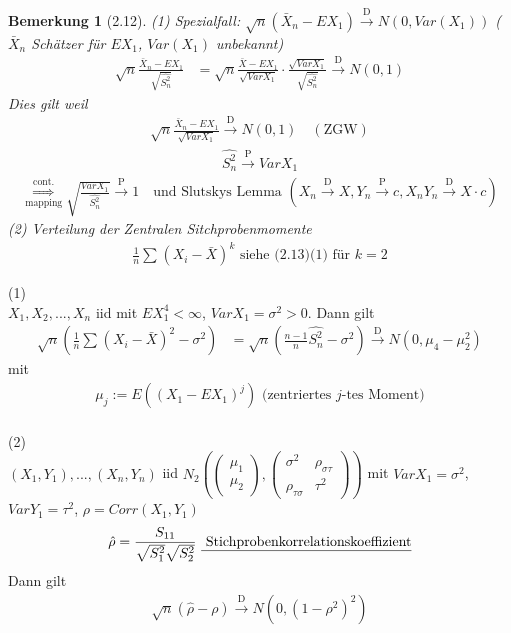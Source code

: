 \documentclass[a4paper,openany]{book}
\theoremstyle{mytheoremstyle}
\newtheorem*{bem}{Bemerkung}
\theoremstyle{mytheoremstyle2}
\begin{document}
\begin{bem}[2.12]
  (1) Spezialfall: $\sqrt{n}(\bar{X}_n-EX_1)\overset{\text{D}}\to N(0,Var(X_1))$ ($\bar{X}_n$ Schätzer für $EX_1$, $Var(X_1)$ unbekannt)
  \begin{align*}
    \sqrt{n}\frac{\bar{X}_n-EX_1}{\sqrt{\hat{S_n^2}}}&=\sqrt{n}\frac{\bar{X}-EX_1}{\sqrt{Var X_1}}\cdot \frac{\sqrt{Var X_1}}{\sqrt{\hat{S_n^2}}}
                                                     \overset{\text{D}}\to N(0,1)
  \end{align*}
  Dies gilt weil
  \begin{align*}
    \sqrt{n}\frac{\bar{X}_n-EX_1}{\sqrt{Var X_1}}\overset{\text{D}}\to N(0,1)\quad (\text{ZGW})
  \end{align*}
  \begin{align*}
    \hat{S_n^2}\overset{\text{P}}\to Var X_1
  \end{align*}
  \begin{align*}
   \overset{\text{cont.}}{\underset{\text{mapping}}{\Rightarrow }} \sqrt{\frac{Var X_1}{\hat{S_n^2}}}\overset{\text{P}}\to 1\quad \text{und Slutskys Lemma } (X_n \overset{\text{D}}\to X, Y_n \overset{\text{P}}\to c, X_nY_n \overset{\text{D}}\to X \cdot c) 
  \end{align*}
  (2) Verteilung der Zentralen Sitchprobenmomente 
  \begin{align*}
    \frac{1}{n}\sum_{}^{}{(X_i-\bar{X})^k} \text{  siehe (2.13)(1) für $k=2$}
  \end{align*}
\end{bem}
\begin{lem}{2.13}{}
  (1) \\
  $X_1,X_2,...,X_n $ iid mit $EX_1^4< \infty$, $Var X_1=\sigma ^2>0$. Dann gilt
  \begin{align*}
    \sqrt{n}\left(\frac{1}{n}\sum_{}^{}{(X_i-\bar{X})^2-\sigma ^2}\right)&=\sqrt{n}\left(\frac{n-1}{n}\hat{S_n^2}-\sigma ^2\right)\overset{\text{D}}\to N(0,\mu _4-\mu _2^2)
  \end{align*}
  mit 
  \begin{align*}
    \mu _j:=E((X_1-EX_1)^j)\text{ (zentriertes $j$-tes  Moment)}
  \end{align*}   \\
  (2)\\
  $(X_1,Y_1),...,(X_n,Y_n)$ iid $N_2\left(\begin{pmatrix}\mu _1\\\mu _2\end{pmatrix},\begin{pmatrix}
    \sigma ^2&\rho _{\sigma \tau}\\\rho _{\tau \sigma }&\tau^2
  \end{pmatrix}\right)$  mit $VarX_1=\sigma ^2$, $Var Y_1=\tau^2$, $\rho =Corr(X_1,Y_1)$
  \begin{align*}
    \hat{\rho }=\frac{S _{11}}{\sqrt{S_1^2}\sqrt{S_2^2}}\text{ \underline{ Stichprobenkorrelationskoeffizient}}
  \end{align*}
  Dann gilt 
  \begin{align*}
    \sqrt{n}(\hat{\rho }-\rho )\overset{\text{D}}\to N(0,(1-\rho ^2)^2)
  \end{align*}
\end{lem}
\end{document}
